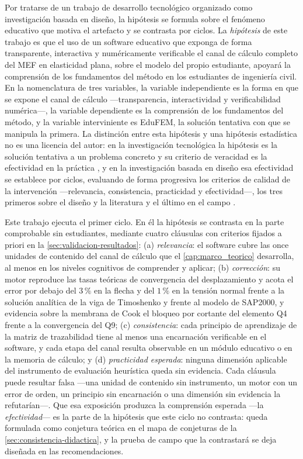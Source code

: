 Por tratarse de un trabajo de desarrollo tecnológico organizado como investigación basada en diseño, la hipótesis se formula sobre el fenómeno educativo que motiva el artefacto y se contrasta por ciclos. La \emph{hipótesis} de este trabajo es que el uso de un software educativo que exponga de forma transparente, interactiva y numéricamente verificable el canal de cálculo completo del MEF en elasticidad plana, sobre el modelo del propio estudiante, apoyará la comprensión de los fundamentos del método en los estudiantes de ingeniería civil. En la nomenclatura de tres variables, la variable independiente es la forma en que se expone el canal de cálculo —transparencia, interactividad y verificabilidad numérica—, la variable dependiente es la comprensión de los fundamentos del método, y la variable interviniente es EduFEM, la solución tentativa con que se manipula la primera. La distinción entre esta hipótesis y una hipótesis estadística no es una licencia del autor: en la investigación tecnológica la hipótesis es la solución tentativa a un problema concreto y su criterio de veracidad es la efectividad en la práctica \autocite[p.~85]{garciacordoba2005tecnologica}, y en la investigación basada en diseño esa efectividad se establece por ciclos, evaluando de forma progresiva los criterios de calidad de la intervención —relevancia, consistencia, practicidad y efectividad—, los tres primeros sobre el diseño y la literatura y el último en el campo \autocite{nieveen2013formative}. %

Este trabajo ejecuta el primer ciclo. En él la hipótesis se contrasta en la parte comprobable sin estudiantes, mediante cuatro cláusulas con criterios fijados a priori en la \autoref{sec:validacion-resultados}: (a) \emph{relevancia}: el software cubre las once unidades de contenido del canal de cálculo que el \autoref{cap:marco_teorico} desarrolla, al menos en los niveles cognitivos de comprender y aplicar; (b) \emph{corrección}: su motor reproduce las tasas teóricas de convergencia del desplazamiento y acota el error por debajo del $3\,\%$ en la flecha y del $1\,\%$ en la tensión normal frente a la solución analítica de la viga de Timoshenko y frente al modelo de SAP2000, y evidencia sobre la membrana de Cook el bloqueo por cortante del elemento Q4 frente a la convergencia del Q9; (c) \emph{consistencia}: cada principio de aprendizaje de la matriz de trazabilidad tiene al menos una encarnación verificable en el software, y cada etapa del canal resulta observable en un módulo educativo o en la memoria de cálculo; y (d) \emph{practicidad esperada}: ninguna dimensión aplicable del instrumento de evaluación heurística queda sin evidencia. Cada cláusula puede resultar falsa —una unidad de contenido sin instrumento, un motor con un error de orden, un principio sin encarnación o una dimensión sin evidencia la refutarían—. Que esa exposición produzca la comprensión esperada —la \emph{efectividad}— es la parte de la hipótesis que este ciclo no contrasta: queda formulada como conjetura teórica en el mapa de conjeturas de la \autoref{sec:consistencia-didactica}, y la prueba de campo que la contrastará se deja diseñada en las recomendaciones.

